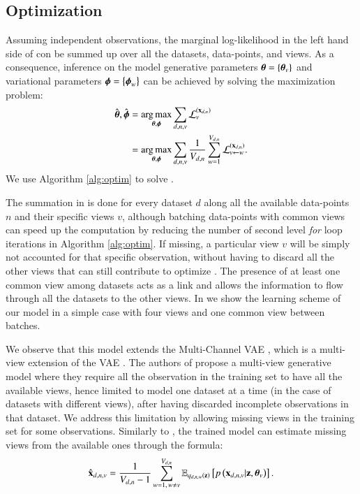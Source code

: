 \subsection{Optimization}

Assuming independent observations, the marginal log-likelihood in the left hand side of  con be summed up over all the datasets, data-points, and views.
As a consequence, inference on the model generative parameters $\boldsymbol{\theta} = \left\{\boldsymbol{\theta}_v\right\}$ and variational parameters $\boldsymbol{\phi} = \left\{\boldsymbol{\phi}_w\right\}$ can be achieved by solving the maximization problem:
\begin{equation}\label{eq:argmax}
\begin{aligned}
\hat{\boldsymbol{\theta}}, \hat{\boldsymbol{\phi}} &= \underset{\boldsymbol{\theta}, \boldsymbol{\phi}}{\operatorname{arg\,max}} \sum_{d,n,v} \mathcal{L}_v^{(\mathbf{x}_{d,n})} \\
                           &= \underset{\boldsymbol{\theta}, \boldsymbol{\phi}}{\operatorname{arg\,max}} \sum_{d,n,v} \frac{1}{V_{d,n}} \sum_{w=1}^{V_{d,n}} \mathcal{L}_{v \leftarrow w}^{(\mathbf{x}_{d,n})}.
\end{aligned}
\end{equation}
We use Algorithm \ref{alg:optim} to solve .

The summation in  is done for every dataset $d$ along all the available data-points $n$ and their specific views $v$, although batching data-points with common views can speed up the computation by reducing the number of second level \textit{for} loop iterations in Algorithm \ref{alg:optim}.
If missing, a particular view $v$ will be simply not accounted for that specific observation, without having to discard all the other views that can still contribute to optimize .
The presence of at least one common view among datasets acts as a link and allows the information to flow through all the datasets to the other views.
In  we show the learning scheme of our model in a simple case with four views and one common view between batches.



We observe that this model extends the Multi-Channel VAE \citep{Antelmi2019}, which is a multi-view extension of the VAE \citep{Kingma2013,Rezende2014}.
The authors of \cite{Antelmi2019} propose a multi-view generative model where they require all the observation in the training set to have all the available views, hence limited to model one dataset at a time (in the case of datasets with different views), after having discarded incomplete observations in that dataset.
We address this limitation by allowing missing views in the training set for some observations.
Similarly to \cite{Antelmi2019}, the trained model can estimate missing views from the available ones through the formula:
\begin{equation}\label{eq:reconstruction}
\begin{aligned}
\hat{\mathbf{x}}_{d,n,v} = \frac{1}{V_{d, n}-1} \sum_{w=1, \,w\neq v}^{V_{d, n}} \operatorname{\mathbb{E}}_{q_{d,n,w}(\mathbf{z})}\left[p\left(\mathbf{x}_{d,n,v}|\mathbf{z}, \boldsymbol{\theta}_v\right)\right].
\end{aligned}
\end{equation}

